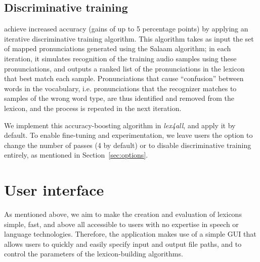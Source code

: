 \documentclass[11pt]{article}
\begin{document}
\subsection{Discriminative training}
\label{sec:discrimtrain}
 achieve increased accuracy (gains of up to 5 percentage points) by applying an iterative discriminative training algorithm.
This algorithm takes as input the set of mapped pronunciations generated using the Salaam algorithm; %
in each iteration, it simulates recognition of the training audio samples using these pronunciations, and outputs a ranked list of the pronunciations in the lexicon that best match each sample.
Pronunciations that cause ``confusion'' between words in the vocabulary, i.e. pronunciations that the recognizer matches to samples of the wrong word type, are thus identified and removed from the lexicon, and the process is repeated in the next iteration. 

We implement this accuracy-boosting algorithm in \textit{lex4all}, and apply it by default. 
To enable fine-tuning and experimentation,
we leave users the option to change the number of passes (4 by default) or to disable discriminative training entirely, as mentioned in Section~\ref{sec:options}.





\section{User interface}
\label{sec:frontend}

As mentioned above, we aim to make the creation and evaluation of lexicons simple, fast, and above all accessible to users with no expertise in speech or language technologies. Therefore, the application makes use of a simple 
GUI 
that allows users to quickly and easily specify input and output file paths, and to control the parameters of the lexicon-building algorithms. 
\end{document}
